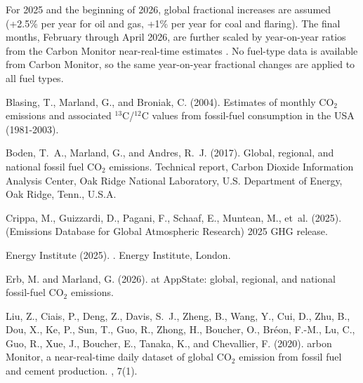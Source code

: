 \documentclass[11pt,openany]{book}
\begin{document}
\begin{description}
  For 2025 and the beginning of 2026, global fractional increases
  are assumed (+2.5\% per year for oil and gas, +1\% per year for
  coal and flaring).  The final months, February through April 2026,
  are further scaled by year-on-year ratios from the Carbon Monitor
  near-real-time estimates \citep{liu20a}.  No fuel-type data is
  available from Carbon Monitor, so the same year-on-year fractional
  changes are applied to all fuel types.

\end{description}

\begin{thebibliography}{}

Blasing, T., Marland, G., and Broniak, C. (2004).
\newblock Estimates of monthly {CO}$_2$ emissions and associated
  $^{13}${C}/$^{12}${C} values from fossil-fuel consumption in the {USA}
  (1981-2003).

Boden, T.~A., Marland, G., and Andres, R.~J. (2017).
\newblock Global, regional, and national fossil fuel {CO}$_2$ emissions.
\newblock Technical report, Carbon Dioxide Information Analysis Center, Oak
  Ridge National Laboratory, U.S. Department of Energy, Oak Ridge, Tenn.,
  U.S.A.

Crippa, M., Guizzardi, D., Pagani, F., Schaaf, E., Muntean, M., et~al. (2025).
 ({E}missions {D}atabase for {G}lobal {A}tmospheric
  {R}esearch) 2025 {GHG} release.

{Energy Institute} (2025).
.
\newblock Energy Institute, London.

Erb, M. and Marland, G. (2026).
 at {AppState}: global, regional, and national fossil-fuel
  {CO}$_2$ emissions.

Liu, Z., Ciais, P., Deng, Z., Davis, S.~J., Zheng, B., Wang, Y., Cui, D., Zhu,
  B., Dou, X., Ke, P., Sun, T., Guo, R., Zhong, H., Boucher, O., Br{\'{e}}on,
  F.-M., Lu, C., Guo, R., Xue, J., Boucher, E., Tanaka, K., and Chevallier, F.
  (2020).
arbon {M}onitor, a near-real-time daily dataset of global {CO}$_2$
  emission from fossil fuel and cement production.
, 7(1).


\end{thebibliography}
\end{document}
